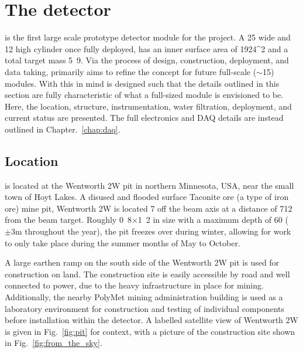 \section{The \chipsfive detector} %
\label{sec:chips_detector} %

\chipsfive is the first large scale prototype detector module for the \chips project. A
\unit{25}{} wide and \unit{12}{} high cylinder once fully deployed, \chipsfive
has an inner surface area of \unit{1924}{^2} and a total target mass
\unit{5.9}{}. Via the process of design, construction, deployment, and data taking,
\chipsfive primarily aims to refine the \chips concept for future full-scale
($\sim$\unit{15}{}) modules. With this in mind \chipsfive is designed such that the
details outlined in this section are fully characteristic of what a full-sized \chips module is
envisioned to be. Here, the location, structure, instrumentation, water filtration, deployment,
and current status are presented. The full electronics and DAQ details are instead outlined in
Chapter.~\ref{chap:daq}.

\subsection{Location} %
\label{sec:chips_detector_location} %

\chipsfive is located at the Wentworth 2W pit in northern Minnesota, USA, near the small town of
Hoyt Lakes. A disused and flooded surface Taconite ore (a type of iron ore) mine pit, Wentworth 2W
is located \unit{7}{} off the \numi beam axis at a distance of
\unit{712}{} from the beam target. Roughly
\unit{0.8}{}$\times$\unit{1.2}{} in size with a maximum depth of
\unit{60}{} ($\pm3\mathrm{m}$ throughout the year), the pit freezes over during winter,
allowing for work to only take place during the summer months of May to October.

A large earthen ramp on the south side of the Wentworth 2W pit is used for construction on land.
The construction site is easily accessible by road and well connected to power, due to the heavy
infrastructure in place for mining. Additionally, the nearby PolyMet mining administration
building is used as a laboratory environment for construction and testing of individual components
before installation within the detector. A labelled satellite view of Wentworth 2W is given in
Fig.~\ref{fig:pit} for context, with a picture of the construction site shown in
Fig.~\ref{fig:from_the_sky}.

